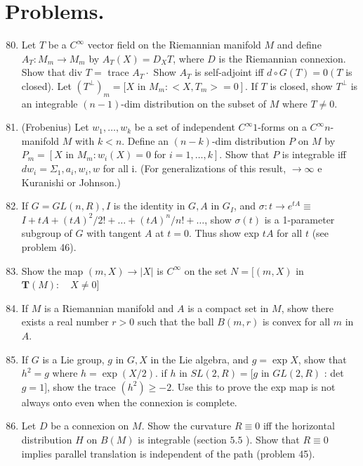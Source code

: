 \documentclass[10pt]{article}
\begin{document}
\section{Problems.}
\begin{enumerate}
  \setcounter{enumi}{79}
  \item Let $T$ be a $C^{\infty}$ vector field on the Riemannian manifold $M$ and define $A_{T}: M_{m} \rightarrow M_{m}$ by $A_{T}(X)=D_{X} T$, where $D$ is the Riemannian connexion. Show that div $T=$ trace $A_{T} \cdot$ Show $A_{T}$ is self-adjoint iff $d \circ G(T)=0\left(T\right.$ is closed). Let $\left(T^{\perp}\right)_{m}=[X$ in $\left.M_{m}:<X, T_{m}>=0\right]$. If $T$ is closed, show $T^{\perp}$ is an integrable $(n-1)$-dim distribution on the subset of $M$ where $T \neq 0$.

  \item (Frobenius) Let $w_{1}, \ldots, w_{k}$ be a set of independent $C^{\infty} 1$-forms on a $C^{\infty} n$-manifold $M$ with $k<n$. Define an $(n-k)$-dim distribution $P$ on $M$ by $P_{m}=\left[X\right.$ in $M_{m}: w_{i}(X)=0$ for $\left.i=1, \ldots, k\right]$. Show that $P$ is integrable iff $d w_{i}=\Sigma_{1}, a_{i}, w_{i}, w$ for all i. (For generalizations of this result, $\rightarrow \infty$ e Kuranishi or Johnson.)

  \item If $G=G L(n, R), I$ is the identity in $G, A$ in $G_{I}$, and $\sigma: t \rightarrow e^{t A} \equiv$ $I+t A+(t A)^{2} / 2 !+\ldots+(t A)^{n} / n !+\ldots$, show $\sigma(t)$ is a 1-parameter subgroup of $G$ with tangent $A$ at $t=0$. Thus show exp $t A$ for all $t$ (see problem 46).

  \item Show the map $(m, X) \rightarrow|X|$ is $C^{\infty}$ on the set $N=[(m, X)$ in $\boldsymbol{T}(M): \quad X \neq 0]$

  \item If $M$ is a Riemannian manifold and $A$ is a compact set in $M$, show there exists a real number $r>0$ such that the ball $B(m, r)$ is convex for all $m$ in $A$.

  \item If $G$ is a Lie group, $g$ in $G, X$ in the Lie algebra, and $g=\exp X$, show that $h^{2}=g$ where $h=\exp (X / 2)$. if $h$ in $S L(2, R)=[g$ in $G L(2, R)$ : det $g=1]$, show the trace $\left(h^{2}\right) \geq-2$. Use this to prove the exp map is not always onto even when the connexion is complete.

  \item Let $D$ be a connexion on $M$. Show the curvature $R \equiv 0$ iff the horizontal distribution $H$ on $B(M)$ is integrable (section $5.5$ ). Show that $R \equiv 0$ implies parallel translation is independent of the path (problem 45).

\end{enumerate}
\end{document}
